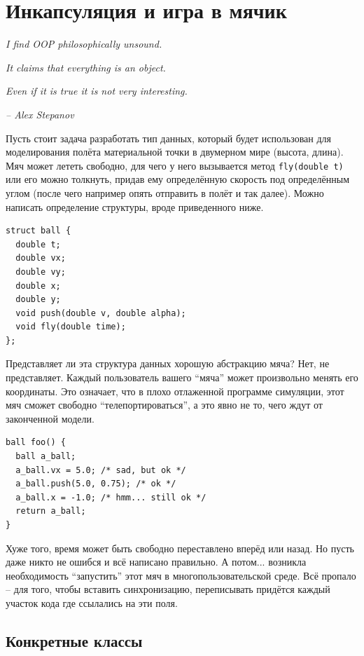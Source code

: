 \documentclass[a4paper,12pt,oneside]{book}
\begin{document}
\pagebreak
\section{Инкапсуляция и игра в мячик}\label{Encapsulation}

\hfill\textit{I find OOP philosophically unsound.}

\hfill\textit{It claims that everything is an object.}

\hfill\textit{Even if it is true it is not very interesting.} {\vspace{0.5em}}

\hfill\textit{-- Alex Stepanov}

Пусть стоит задача разработать тип данных, который будет использован для моделирования полёта материальной точки в двумерном мире (высота, длина). Мяч может лететь свободно, для чего у него вызывается метод \lstinline!fly(double t)! или его можно толкнуть, придав ему определённую скорость под определённым углом (после чего например опять отправить в полёт и так далее). Можно написать определение структуры, вроде приведенного ниже.

\begin{lstlisting}
struct ball {
  double t;
  double vx;
  double vy;
  double x;
  double y;
  void push(double v, double alpha);
  void fly(double time);
};
\end{lstlisting}

Представляет ли эта структура данных хорошую абстракцию мяча? Нет, не представляет. Каждый пользователь вашего ``мяча'' может произвольно менять его координаты. Это означает, что в плохо отлаженной программе симуляции, этот мяч сможет свободно ``телепортироваться'', а это явно не то, чего ждут от законченной модели. 

\begin{lstlisting}
ball foo() {
  ball a_ball;
  a_ball.vx = 5.0; /* sad, but ok */
  a_ball.push(5.0, 0.75); /* ok */
  a_ball.x = -1.0; /* hmm... still ok */  
  return a_ball;
}
\end{lstlisting}

Хуже того, время может быть свободно переставлено вперёд или назад. Но пусть даже никто не ошибся и всё написано правильно. А потом... возникла необходимость ``запустить'' этот мяч в многопользовательской среде. Всё пропало – для того, чтобы вставить синхронизацию, переписывать придётся каждый участок кода где ссылались на эти поля.

\subsection{Конкретные классы}\label{ConcreteClasses}
\end{document}
